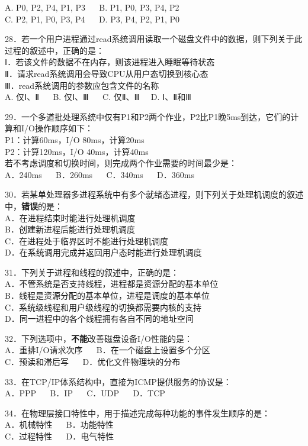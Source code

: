 A. P0, P2, P4, P1, P3 $\quad$ B. P1, P0, P3, P4, P2 \\
C. P2, P1, P0, P3, P4 $\quad$ D. P3, P4, P2, P1, P0

28．若一个用户进程通过read系统调用读取一个磁盘文件中的数据，则下列关于此过程的叙述中，正确的是：\\
Ⅰ．若该文件的数据不在内存，则该进程进入睡眠等待状态\\
Ⅱ．请求read系统调用会导致CPU从用户态切换到核心态\\
Ⅲ．read系统调用的参数应包含文件的名称\\
A. 仅Ⅰ、Ⅱ $\quad$ B. 仅Ⅰ、Ⅲ $\quad$ C. 仅Ⅱ、Ⅲ  $\quad$D. Ⅰ、Ⅱ和Ⅲ

29．一个多道批处理系统中仅有P1和P2两个作业，P2比P1晚5ms到达，它们的计算和I/O操作顺序如下：\\
P1：计算60ms，I/O 80ms，计算20ms\\
P2：计算120ms，I/O 40ms，计算40ms\\
若不考虑调度和切换时间，则完成两个作业需要的时间最少是：\\
A．240ms $\quad$ B．260ms $\quad$ C．340ms $\quad$ D．360ms

30．若某单处理器多进程系统中有多个就绪态进程，则下列关于处理机调度的叙述中，\textbf{错误}的是：\\
A．在进程结束时能进行处理机调度\\
B．创建新进程后能进行处理机调度\\
C．在进程处于临界区时不能进行处理机调度\\
D．在系统调用完成并返回用户态时能进行处理机调度

31．下列关于进程和线程的叙述中，正确的是：\\
A．不管系统是否支持线程，进程都是资源分配的基本单位\\
B．线程是资源分配的基本单位，进程是调度的基本单位\\
C．系统级线程和用户级线程的切换都需要内核的支持\\
D．同一进程中的各个线程拥有各自不同的地址空间

32．下列选项中，\textbf{不能}改善磁盘设备I/O性能的是： \\
A．重排I/O请求次序 $\quad$ B．在一个磁盘上设置多个分区 \\
C．预读和滞后写 $\quad$ D．优化文件物理块的分布

33．在TCP/IP体系结构中，直接为ICMP提供服务的协议是：\\
A．PPP $\quad$ B．IP $\quad$ C．UDP $\quad$ D．TCP

34．在物理层接口特性中，用于描述完成每种功能的事件发生顺序的是：\\
A．机械特性 $\quad$ B．功能特性 \\
C．过程特性 $\quad$ D．电气特性

